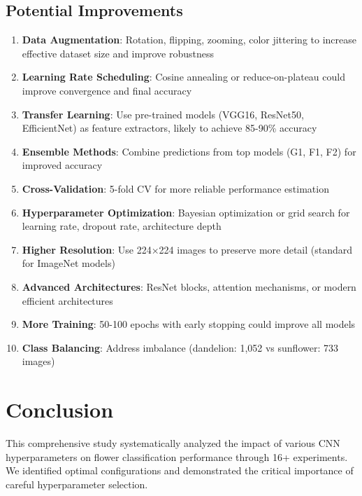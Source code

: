 \documentclass[12pt,a4paper]{article}
\begin{document}
\subsection{Potential Improvements}
\begin{enumerate}
    \item \textbf{Data Augmentation}: Rotation, flipping, zooming, color jittering to increase effective dataset size and improve robustness
    
    \item \textbf{Learning Rate Scheduling}: Cosine annealing or reduce-on-plateau could improve convergence and final accuracy
    
    \item \textbf{Transfer Learning}: Use pre-trained models (VGG16, ResNet50, EfficientNet) as feature extractors, likely to achieve 85-90\% accuracy
    
    \item \textbf{Ensemble Methods}: Combine predictions from top models (G1, F1, F2) for improved accuracy
    
    \item \textbf{Cross-Validation}: 5-fold CV for more reliable performance estimation
    
    \item \textbf{Hyperparameter Optimization}: Bayesian optimization or grid search for learning rate, dropout rate, architecture depth
    
    \item \textbf{Higher Resolution}: Use 224×224 images to preserve more detail (standard for ImageNet models)
    
    \item \textbf{Advanced Architectures}: ResNet blocks, attention mechanisms, or modern efficient architectures
    
    \item \textbf{More Training}: 50-100 epochs with early stopping could improve all models
    
    \item \textbf{Class Balancing}: Address imbalance (dandelion: 1,052 vs sunflower: 733 images)
\end{enumerate}

\section{Conclusion}

This comprehensive study systematically analyzed the impact of various CNN hyperparameters on flower classification performance through 16+ experiments. We identified optimal configurations and demonstrated the critical importance of careful hyperparameter selection.
\end{document}

